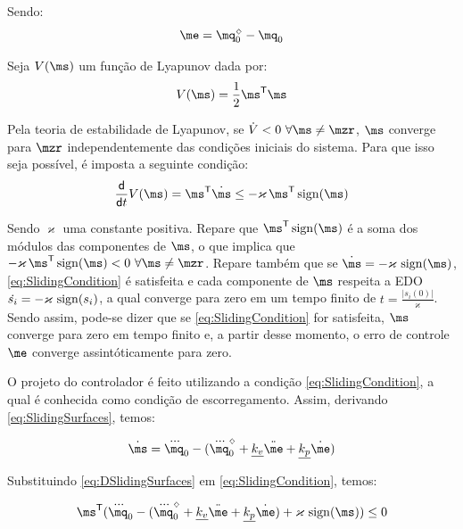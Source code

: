 \documentclass[a4paper,11pt,brazil,fleqn]{article}
\begin{document}
Sendo:
\begin{equation}
\me = \mq_0^\sdia - \mq_0
\end{equation}

Seja $V(\ms)$ um fun\c{c}\~ao de Lyapunov dada por:
\begin{equation}
V(\ms) = \frac{1}{2} \ms^\msT \ms
\end{equation}

Pela teoria de estabilidade de Lyapunov, se $\dot{V} < 0 \,\, \forall \ms \neq \mzr$, $\ms$ converge para $\mzr$ independentemente das condi\c{c}\~oes iniciais do sistema. Para que isso seja poss\'ivel, \'e imposta a seguinte condi\c{c}\~ao:
\begin{equation} \label{eq:SlidingCondition}
\frac{\dd}{\dd t} V(\ms) = \ms^\msT \dot{\ms} \leq - \varkappa \, \ms^\msT \sign(\ms) 
\end{equation}

Sendo $\varkappa$ uma constante positiva. Repare que $\ms^\msT \sign(\ms)$ \'e a soma dos m\'odulos das componentes de $\ms$, o que implica que $- \varkappa \, \ms^\msT \sign(\ms) < 0 \,\, \forall \ms \neq \mzr$. Repare tamb\'em que se $\dot{\ms} = - \varkappa \,\sign(\ms)$,  \eqref{eq:SlidingCondition} \'e satisfeita e cada componente de $\ms$ respeita a EDO $\dot{s_i} = - \varkappa \,\operatorname*{sign}(s_i)$, a qual converge para zero em um tempo finito de $t = \frac{|s_i(0)|}{\varkappa}$. Sendo assim, pode-se dizer que se \eqref{eq:SlidingCondition} for satisfeita, $\ms$ converge para zero em tempo finito e, a partir desse momento, o erro de controle $\me$ converge assint\'oticamente para zero.

O projeto do controlador \'e feito utilizando a condi\c{c}\~ao \eqref{eq:SlidingCondition}, a qual \'e conhecida como condi\c{c}\~ao de escorregamento. Assim, derivando \eqref{eq:SlidingSurfaces}, temos:

\begin{equation} \label{eq:DSlidingSurfaces}
\dot{\ms} = \dddot{\mq}_0 -(\dddot{\mq}_0^\sdia + \underline{k_v}\ddot{\me} + \underline{k_p}\dot{\me})
\end{equation}

Substituindo \eqref{eq:DSlidingSurfaces} em \eqref{eq:SlidingCondition}, temos:

\begin{equation} \label{eq:SlidingCondition2}
\ms^\msT (\dddot{\mq}_0 -(\dddot{\mq}_0^\sdia + \underline{k_v}\ddot{\me} + \underline{k_p}\dot{\me}) + \varkappa \, \sign(\ms) ) \leq 0
\end{equation} \\
\end{document}

